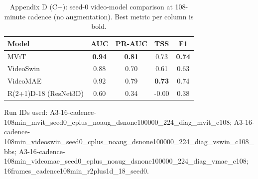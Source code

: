 \begin{table}[p]
\centering
\scriptsize
\caption{Appendix D (C+): seed-0 video-model comparison at 108-minute cadence (no augmentation). Best metric per column is bold.}
\label{tab:appD_video_c}
\begin{tabular}{lcccc}
\toprule
Model & AUC & PR-AUC & TSS & F1 \\
\midrule
MViT & \textbf{0.94} & \textbf{0.81} & 0.73 & \textbf{0.74} \\
VideoSwin & 0.88 & 0.70 & 0.61 & 0.63 \\
VideoMAE & 0.92 & 0.79 & \textbf{0.73} & 0.74 \\
R(2+1)D-18 (ResNet3D) & 0.60 & 0.34 & -0.00 & 0.38 \\
\bottomrule
\end{tabular}
\vspace{2mm}
\begin{flushleft}\scriptsize Run IDs used: A3-16-cadence-108min\_mvit\_seed0\_cplus\_noaug\_dsnone100000\_224\_diag\_mvit\_c108; A3-16-cadence-108min\_videoswin\_seed0\_cplus\_noaug\_dsnone100000\_224\_diag\_vswin\_c108\_bbs; A3-16-cadence-108min\_videomae\_seed0\_cplus\_noaug\_dsnone100000\_224\_diag\_vmae\_c108; 16frames\_cadence108min\_r2plus1d\_18\_seed0.\end{flushleft}
\end{table}
